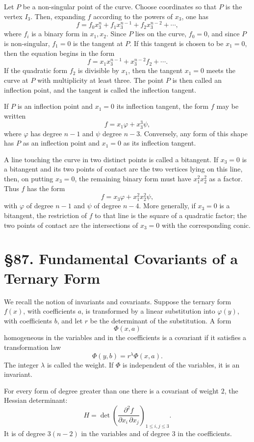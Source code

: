 \documentclass[11pt,a4paper]{book}
\newcommand{\webersection}[2]{\clearpage\section*{\S #1. #2}}
\begin{document}
Let \(P\) be a non-singular point of the curve.  Choose coordinates so that \(P\) is the vertex \(I_3\).  Then, expanding \(f\) according to the powers of \(x_3\), one has
\[
f=f_0x_3^n+f_1x_3^{n-1}+f_2x_3^{n-2}+\cdots ,
\]
where \(f_i\) is a binary form in \(x_1,x_2\).  Since \(P\) lies on the curve, \(f_0=0\), and since \(P\) is non-singular, \(f_1=0\) is the tangent at \(P\).  If this tangent is chosen to be \(x_1=0\), then the equation begins in the form
\[
f=x_1x_3^{n-1}+x_3^{n-2}f_2+\cdots .
\]
If the quadratic form \(f_2\) is divisible by \(x_1\), then the tangent \(x_1=0\) meets the curve at \(P\) with multiplicity at least three.  The point \(P\) is then called an inflection point, and the tangent is called the inflection tangent.

If \(P\) is an inflection point and \(x_1=0\) its inflection tangent, the form \(f\) may be written
\[
f=x_1\varphi+x_3^3\psi,
\]
where \(\varphi\) has degree \(n-1\) and \(\psi\) degree \(n-3\).  Conversely, any form of this shape has \(P\) as an inflection point and \(x_1=0\) as its inflection tangent.

A line touching the curve in two distinct points is called a bitangent.  If \(x_3=0\) is a bitangent and its two points of contact are the two vertices lying on this line, then, on putting \(x_3=0\), the remaining binary form must have \(x_1^2x_2^2\) as a factor.  Thus \(f\) has the form
\[
f=x_3\varphi+x_1^2x_2^2\psi,
\]
with \(\varphi\) of degree \(n-1\) and \(\psi\) of degree \(n-4\).  More generally, if \(x_3=0\) is a bitangent, the restriction of \(f\) to that line is the square of a quadratic factor; the two points of contact are the intersections of \(x_3=0\) with the corresponding conic.

\webersection{87}{Fundamental Covariants of a Ternary Form}

We recall the notion of invariants and covariants.  Suppose the ternary form \(f(x)\), with coefficients \(a\), is transformed by a linear substitution into \(\varphi(y)\), with coefficients \(b\), and let \(r\) be the determinant of the substitution.  A form
\[
\Phi(x,a)
\]
homogeneous in the variables and in the coefficients is a covariant if it satisfies a transformation law
\[
\Phi(y,b)=r^\lambda\Phi(x,a).
\]
The integer \(\lambda\) is called the weight.  If \(\Phi\) is independent of the variables, it is an invariant.

For every form of degree greater than one there is a covariant of weight \(2\), the Hessian determinant:
\[
H=\det\left(\frac{\partial^2 f}{\partial x_i\,\partial x_j}\right)_{1\le i,j\le 3}.
\]
It is of degree \(3(n-2)\) in the variables and of degree \(3\) in the coefficients.
\end{document}
